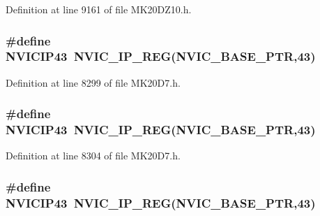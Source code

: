 Definition at line 9161 of file M\+K20\+D\+Z10.\+h.

\subsubsection[{\texorpdfstring{N\+V\+I\+C\+I\+P43}{NVICIP43}}]{\setlength{\rightskip}{0pt plus 5cm}\#define N\+V\+I\+C\+I\+P43~{\bf N\+V\+I\+C\+\_\+\+I\+P\+\_\+\+R\+EG}({\bf N\+V\+I\+C\+\_\+\+B\+A\+S\+E\+\_\+\+P\+TR},43)}\hypertarget{group___n_v_i_c___register___accessor___macros_ga0f1a23808020932ed13bb8b15736385d}{}\label{group___n_v_i_c___register___accessor___macros_ga0f1a23808020932ed13bb8b15736385d}


Definition at line 8299 of file M\+K20\+D7.\+h.

\subsubsection[{\texorpdfstring{N\+V\+I\+C\+I\+P43}{NVICIP43}}]{\setlength{\rightskip}{0pt plus 5cm}\#define N\+V\+I\+C\+I\+P43~{\bf N\+V\+I\+C\+\_\+\+I\+P\+\_\+\+R\+EG}({\bf N\+V\+I\+C\+\_\+\+B\+A\+S\+E\+\_\+\+P\+TR},43)}\hypertarget{group___n_v_i_c___register___accessor___macros_ga0f1a23808020932ed13bb8b15736385d}{}\label{group___n_v_i_c___register___accessor___macros_ga0f1a23808020932ed13bb8b15736385d}


Definition at line 8304 of file M\+K20\+D7.\+h.

\subsubsection[{\texorpdfstring{N\+V\+I\+C\+I\+P43}{NVICIP43}}]{\setlength{\rightskip}{0pt plus 5cm}\#define N\+V\+I\+C\+I\+P43~{\bf N\+V\+I\+C\+\_\+\+I\+P\+\_\+\+R\+EG}({\bf N\+V\+I\+C\+\_\+\+B\+A\+S\+E\+\_\+\+P\+TR},43)}\hypertarget{group___n_v_i_c___register___accessor___macros_ga0f1a23808020932ed13bb8b15736385d}{}\label{group___n_v_i_c___register___accessor___macros_ga0f1a23808020932ed13bb8b15736385d}


